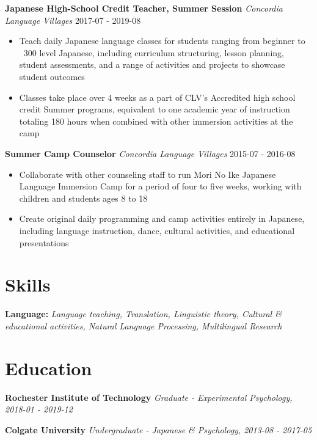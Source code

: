 \documentclass[a4paper,9pt]{extarticle}
\begin{document}
\noindent
\textbf{Japanese High-School Credit Teacher, Summer Session}
\noindent
\textit{Concordia Language Villages} \hfill 2017-07 - 2019-08
\begin{itemize}

\item Teach daily Japanese language classes for students ranging from beginner to ~300 level Japanese, including curriculum structuring, lesson planning, student assessments, and a range of activities and projects to showcase student outcomes
\item Classes take place over 4 weeks as a part of CLV's Accredited high school credit Summer programs, equivalent to one academic year of instruction totaling 180 hours when combined with other immersion activities at the camp
\end{itemize}

\noindent
\textbf{Summer Camp Counselor}
\noindent
\textit{Concordia Language Villages} \hfill 2015-07 - 2016-08
\begin{itemize}

\item Collaborate with other counseling staff to run Mori No Ike Japanese Language Immersion Camp for a period of four to five weeks, working with children and students ages 8 to 18
\item Create original daily programming and camp activities entirely in Japanese, including language instruction, dance, cultural activities, and educational presentations
\end{itemize}



\section*{Skills}

\noindent
\textbf{Language:}
\textit{Language teaching, Translation, Linguistic theory, Cultural \& educational activities, Natural Language Processing, Multilingual Research}



\section*{Education}

\noindent
\textbf{Rochester Institute of Technology}
\textit{Graduate - Experimental Psychology, 2018-01 - 2019-12}

\noindent
\textbf{Colgate University}
\textit{Undergraduate - Japanese \& Psychology, 2013-08 - 2017-05}
\end{document}
